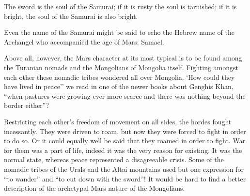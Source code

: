 \begin{quotex}
The sword is the soul of the Samurai; if it is rusty the soul is tarnished; if it is bright, the soul of the Samurai is also bright.
\end{quotex}


Even the name of the Samurai might be said to echo the Hebrew name of the Archangel who accompanied the age of Mars: Samael.

Above all, however, the Mars character at its most typical is to be found among the Turanian nomads and the Mongolians of Mongolia itself. Fighting amongst each other these nomadic tribes wondered all over Mongolia. `How could they have lived in peace'' we read in one of the newer books about Genghis Khan, ``when pastures were growing ever more scarce and there was nothing beyond the border either''?

Restricting each other's freedom of movement on all sides, the hordes fought incessantly. They were driven to roam, but now they were forced to fight in order to do so. Or it could equally well be said that they roamed in order to fight. War for them was a part of life, indeed it was the very reason for existing. It was the normal state, whereas peace represented a disagreeable crisis. Some of the nomadic tribes of the Urals and the Altai mountains used but one expression for ``to wander'' and ``to cut down with the sword''! It would be hard to find a better description of the archetypal Mars nature of the Mongolians.




